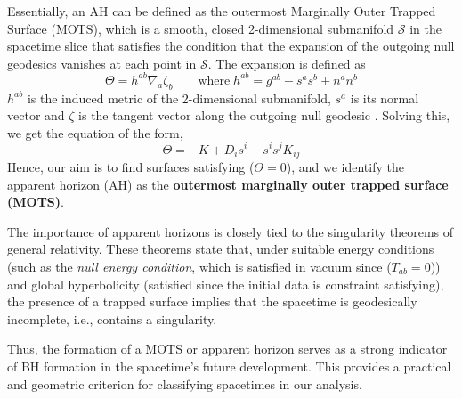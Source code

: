 Essentially, an AH can be defined as the outermost Marginally Outer Trapped Surface (MOTS), which is a smooth, closed 2-dimensional submanifold $\mathcal{S}$ in the spacetime slice that satisfies the condition that the expansion of the outgoing null geodesics vanishes at each point in $\mathcal{S}$. The expansion is defined as 
$$
\Theta = h^{ab} \nabla_a \zeta_b \qquad \text{where} \; h^{ab}= g^{ab}-s^as^b + n^a n^b 
$$
$h^{ab}$ is the induced metric of the 2-dimensional submanifold, $s^a$ is its normal vector and $\zeta$ is the tangent vector along the outgoing null geodesic . Solving this, we get the equation of the form,
\begin{equation}
\Theta = -K + D_i s^i +s^is^j K_{ij} 
\label{Horizon}
\end{equation}
Hence, our aim is to find surfaces satisfying ($\Theta = 0$), and we identify the apparent horizon (AH) as the \textbf{outermost marginally outer trapped surface (MOTS)}.

The importance of apparent horizons is closely tied to the singularity theorems of general relativity. These theorems state that, under suitable energy conditions (such as the \textit{null energy condition}, which is satisfied in vacuum since ($T_{ab}=0$)) and global hyperbolicity (satisfied since the initial data is constraint satisfying), the presence of a trapped surface implies that the spacetime is geodesically incomplete, i.e., contains a singularity.

Thus, the formation of a MOTS or apparent horizon serves as a strong indicator of BH formation in the spacetime's future development. This provides a practical and geometric criterion for classifying spacetimes in our analysis.



